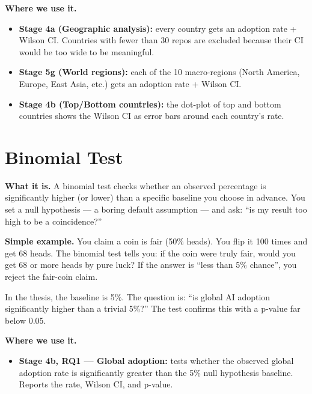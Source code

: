 \documentclass[11pt,a4paper]{article}
\begin{document}
\begin{wherebox}
\textbf{Where we use it.}
\begin{itemize}
  \item \textbf{Stage 4a (Geographic analysis):} every country gets an adoption rate + Wilson CI.
        Countries with fewer than 30 repos are excluded because their CI would be too wide to be meaningful.
  \item \textbf{Stage 5g (World regions):} each of the 10 macro-regions (North America, Europe,
        East Asia, etc.) gets an adoption rate + Wilson CI.
  \item \textbf{Stage 4b (Top/Bottom countries):} the dot-plot of top and bottom countries
        shows the Wilson CI as error bars around each country's rate.
\end{itemize}
\end{wherebox}

\section{Binomial Test}

\begin{conceptbox}
\textbf{What it is.}
A binomial test checks whether an observed percentage is significantly higher (or lower) than
a specific baseline you choose in advance. You set a null hypothesis --- a boring default
assumption --- and ask: ``is my result too high to be a coincidence?''

\medskip
\textbf{Simple example.}
You claim a coin is fair (50\% heads). You flip it 100 times and get 68 heads. The binomial
test tells you: if the coin were truly fair, would you get 68 or more heads by pure luck?
If the answer is ``less than 5\% chance'', you reject the fair-coin claim.

\medskip
In the thesis, the baseline is 5\%. The question is: ``is global AI adoption significantly
higher than a trivial 5\%?'' The test confirms this with a p-value far below 0.05.
\end{conceptbox}

\begin{wherebox}
\textbf{Where we use it.}
\begin{itemize}
  \item \textbf{Stage 4b, RQ1 --- Global adoption:} tests whether the observed global adoption
        rate is significantly greater than the 5\% null hypothesis baseline.
        Reports the rate, Wilson CI, and p-value.
\end{itemize}
\end{wherebox}
\end{document}
